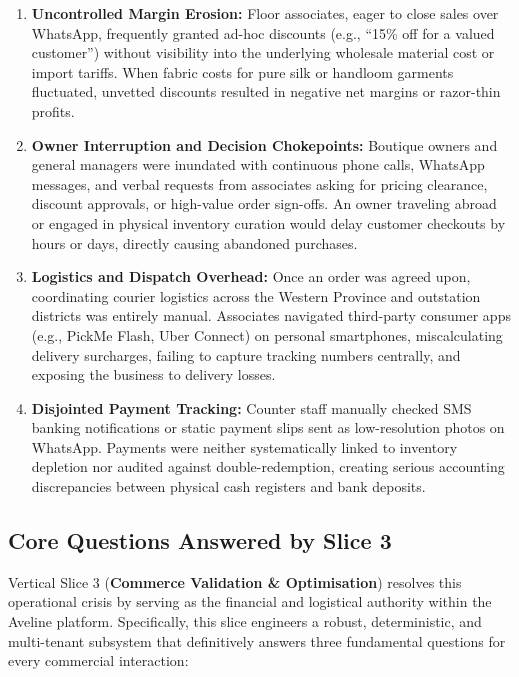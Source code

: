 \begin{enumerate}
    \item \textbf{Uncontrolled Margin Erosion:} Floor associates, eager to close sales over WhatsApp, frequently granted ad-hoc discounts (e.g., ``15\% off for a valued customer'') without visibility into the underlying wholesale material cost or import tariffs. When fabric costs for pure silk or handloom garments fluctuated, unvetted discounts resulted in negative net margins or razor-thin profits.
    \item \textbf{Owner Interruption and Decision Chokepoints:} Boutique owners and general managers were inundated with continuous phone calls, WhatsApp messages, and verbal requests from associates asking for pricing clearance, discount approvals, or high-value order sign-offs. An owner traveling abroad or engaged in physical inventory curation would delay customer checkouts by hours or days, directly causing abandoned purchases.
    \item \textbf{Logistics and Dispatch Overhead:} Once an order was agreed upon, coordinating courier logistics across the Western Province and outstation districts was entirely manual. Associates navigated third-party consumer apps (e.g., PickMe Flash, Uber Connect) on personal smartphones, miscalculating delivery surcharges, failing to capture tracking numbers centrally, and exposing the business to delivery losses.
    \item \textbf{Disjointed Payment Tracking:} Counter staff manually checked SMS banking notifications or static payment slips sent as low-resolution photos on WhatsApp. Payments were neither systematically linked to inventory depletion nor audited against double-redemption, creating serious accounting discrepancies between physical cash registers and bank deposits.
\end{enumerate}

\subsection{Core Questions Answered by Slice 3}

Vertical Slice 3 (\textbf{Commerce Validation \& Optimisation}) resolves this operational crisis by serving as the financial and logistical authority within the Aveline platform. Specifically, this slice engineers a robust, deterministic, and multi-tenant subsystem that definitively answers three fundamental questions for every commercial interaction:


